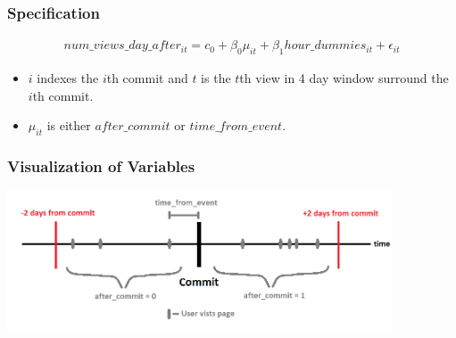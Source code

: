\documentclass[xcolor=pdftex,dvipsnames,table]{beamer}
\begin{document}
\frame
{
    \frametitle{Specification}
    \begin{eqnarray}
    num\_views\_day\_after_{it} = c_0 + \beta_0 \mu_{it} + \beta_1 hour\_dummies_{it} + \epsilon_{it}
    \end{eqnarray}

    \begin{itemize}
        \item $i$ indexes the $i$th commit and $t$ is the $t$th view in 4 day window surround the $i$th commit.
        \item $\mu_{it}$ is either $after\_commit$ or $time\_from\_event$. 
    \end{itemize}
}

\frame
{
    \frametitle{Visualization of Variables}
    \includegraphics[width=4.5in]{pictures/specification_diagram.png}

}
\end{document}
